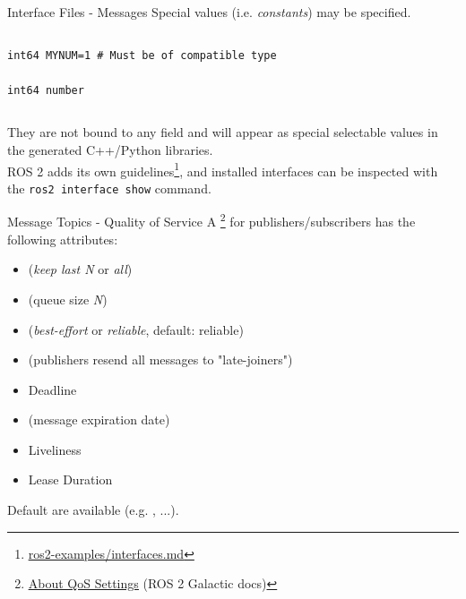 \begin{frame}[fragile]{Interface Files - Messages}
Special values (i.e. \emph{constants}) may be specified.

\begin{columns}
\begin{lstlisting}[language=ros2msg, caption=Definition of an example message with a constant value]
int64 MYNUM=1 # Must be of compatible type

int64 number
\end{lstlisting}
\end{columns}

They are not bound to any field and will appear as special selectable values in the generated C++/Python libraries.\\
ROS 2 adds its own guidelines\footnote{\href{https://github.com/IntelligentSystemsLabUTV/ros2-examples/blob/galactic/interfaces.md}{\color{blue}\underline{ros2-examples/interfaces.md}}}, and installed interfaces can be inspected with the \texttt{ros2 interface show} command.
\end{frame}

\begin{frame}{Message Topics - Quality of Service}
A \footnote{\href{https://docs.ros.org/en/galactic/Concepts/About-Quality-of-Service-Settings.html}{\color{blue}\underline{About QoS Settings}} (ROS 2 Galactic docs)} for publishers/subscribers has the following attributes:
\begin{itemize}
  \item {} (\emph{keep last N} or \emph{all})
  \item {} (queue size \emph{N})
  \item {} (\emph{best-effort} or \emph{reliable}, default: reliable)
  \item {} (publishers resend all messages to "late-joiners")
  \item Deadline
  \item {} (message expiration date)
  \item Liveliness
  \item Lease Duration
\end{itemize}
Default  are available (e.g. , ...).
\end{frame}

